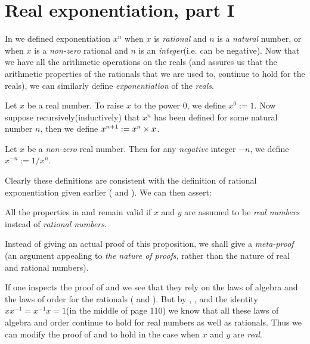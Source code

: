 \section{Real exponentiation, part I} \label{sec 5.6}

In  we defined exponentiation \(x^n\) when \(x\) is \emph{rational} and \(n\) is a \emph{natural} number, or when \(x\) is a \emph{non-zero} rational and \(n\) is an \emph{integer}(i.e. can be negative).
Now that we have all the arithmetic operations on the reals
(and  assures us that the arithmetic properties of the rationals that we are used to, continue to hold for the reals),
we can similarly define \emph{exponentiation} of the \emph{reals}.

\begin{definition}  \label{def 5.6.1}
Let \(x\) be a real number.
To raise \(x\) to the power \(0\), we define \(x^0 := 1\).
Now suppose recursively(inductively) that \(x^n\) has been defined for some natural number \(n\), then we define \(x^{n + 1} := x^n \times x\).
\end{definition}

\begin{definition}  \label{def 5.6.2}
Let \(x\) be a \emph{non-zero} real number.
Then for any \emph{negative} integer \(-n\), we define \(x^{-n} := 1/x^n\).
\end{definition}

Clearly these definitions are consistent with the definition of rational exponentiation given earlier ( and ).
We can then assert:

\begin{proposition} \label{prop 5.6.3}
All the properties in  and  remain valid if \(x\) and \(y\) are assumed to be \emph{real numbers} instead of \emph{rational numbers}.
\end{proposition}

\begin{note}
Instead of giving an actual proof of this proposition, we shall give a \emph{meta-proof} (an argument appealing to \emph{the nature of proofs}, rather than the nature of real and rational numbers).
\end{note}

\begin{meta-proof}
If one inspects the proof of  and  we see that they rely on the laws of algebra and the laws of order for the rationals ( and ).
But by , , and the identity \(xx^{-1} = x^{-1}x = 1\)(in the middle of page 110)
we know that all these laws of algebra and order continue to hold for real numbers as well as rationals.
Thus we can modify the proof of  and  to hold in the case when \(x\) and \(y\) are \emph{real}.
\end{meta-proof}

